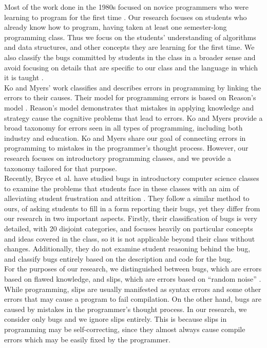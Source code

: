 \documentclass{sig-alternate}
\begin{document}
Most of the work done in the 1980s focused on novice programmers who were learning to program for the first time \cite{SpohrerSoloway86, Pea86}. Our research focuses on students who already know how to program, having taken at least one semester-long programming class. Thus we focus on the students' understanding of algorithms and data structures, and other concepts they are learning for the first time. We also classify the bugs committed by students in the class in a broader sense and avoid focusing on details that are specific to our class and the language in which it is taught \cite{Arnold10}.\\

Ko and Myers' work \cite{KoMyers03} classifies and describes errors in programming by linking the errors to their causes. Their model for programming errors is based on Reason's model \cite{Reason90}. Reason's model demonstrates that mistakes in applying knowledge and strategy cause the cognitive problems that lead to errors. Ko and Myers provide a broad taxonomy for errors seen in all types of programming, including both industry and education. Ko and Myers share our goal of connecting errors in programming to mistakes in the programmer's thought process. However, our research focuses on introductory programming classes, and we provide a taxonomy tailored for that purpose.\\

Recently, Bryce et al. have studied bugs in introductory computer science classes to examine the problems that students face in these classes with an aim of alleviating student frustration and attrition \cite{BryceCooleyHansenHayrapetyan10}. They follow a similar method to ours, of asking students to fill in a form reporting their bugs, yet they differ from our research in two important aspects. Firstly, their classification of bugs is very detailed, with 20 disjoint categories, and focuses heavily on particular concepts and ideas covered in the class, so it is not applicable beyond their class without changes. Additionally, they do not examine student reasoning behind the bug, and classify bugs entirely based on the description and code for the bug.\\

For the purposes of our research, we distinguished between bugs, which are errors based on flawed knowledge, and slips, which are errors based on ``random noise'' \cite{VanLehn90}. While programming, slips are usually manifested as syntax errors and some other errors that may cause a program to fail compilation. On the other hand, bugs are caused by mistakes in the programmer's thought process. In our research, we consider only bugs and we ignore slips entirely. This is because slips in programming may be self-correcting, since they almost always cause compile errors which may be easily fixed by the programmer.\\
\end{document}
